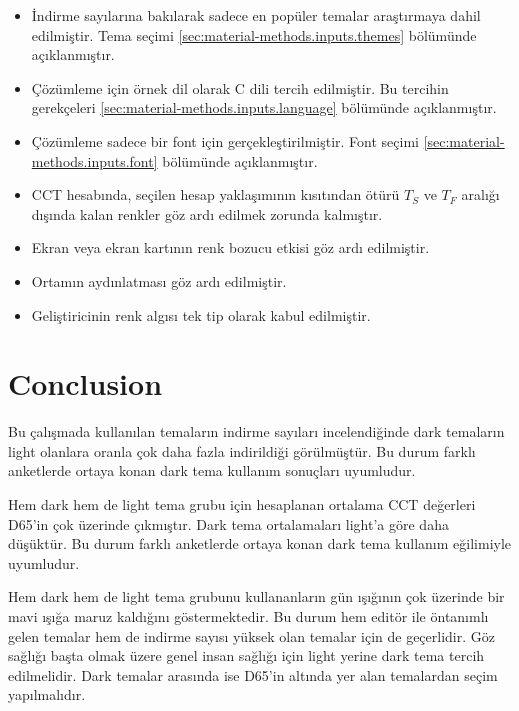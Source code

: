 \documentclass{article}
\begin{document}
\begin{itemize}
  \item İndirme sayılarına bakılarak sadece en popüler temalar araştırmaya dahil edilmiştir.  Tema seçimi
    \ref{sec:material-methods.inputs.themes} bölümünde açıklanmıştır.

  \item Çözümleme için örnek dil olarak C dili tercih edilmiştir.  Bu tercihin gerekçeleri
    \ref{sec:material-methods.inputs.language} bölümünde açıklanmıştır.

  \item Çözümleme sadece bir font için gerçekleştirilmiştir.  Font seçimi \ref{sec:material-methods.inputs.font}
    bölümünde açıklanmıştır.

  \item CCT hesabında, seçilen hesap yaklaşımının kısıtından ötürü $T_S$ ve $T_F$ aralığı dışında kalan renkler göz ardı
    edilmek zorunda kalmıştır.

	\item Ekran veya ekran kartının renk bozucu etkisi göz ardı edilmiştir.

	\item Ortamın aydınlatması göz ardı edilmiştir.

	\item Geliştiricinin renk algısı tek tip olarak kabul edilmiştir.
\end{itemize}

\section{Conclusion}
Bu çalışmada kullanılan temaların indirme sayıları incelendiğinde dark temaların light olanlara oranla çok daha fazla indirildiği görülmüştür. Bu durum farklı anketlerde ortaya konan dark tema kullanım sonuçları uyumludur.

Hem dark hem de light tema grubu için hesaplanan ortalama CCT değerleri D65'in çok üzerinde çıkmıştır. Dark tema ortalamaları light'a göre daha düşüktür. Bu durum farklı anketlerde ortaya konan dark tema kullanım eğilimiyle uyumludur.

Hem dark hem de light tema grubunu kullananların gün ışığının çok üzerinde bir mavi ışığa maruz kaldığını göstermektedir. Bu durum hem editör ile öntanımlı gelen temalar hem de indirme sayısı yüksek olan temalar için de geçerlidir. Göz sağlığı başta olmak üzere genel insan sağlığı için light yerine dark tema tercih edilmelidir. Dark temalar arasında ise D65'in altında yer alan temalardan seçim yapılmalıdır.
\end{document}
